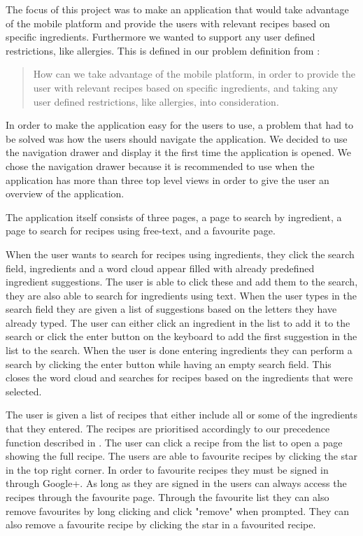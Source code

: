 The focus of this project was to make an application that would take advantage of the mobile platform and provide the users with relevant recipes based on specific ingredients. Furthermore we wanted to support any user defined restrictions, like allergies.
This is defined in our problem definition from :
\begin{quote}
How can we take advantage of the mobile platform, in order to provide the user with relevant recipes based on specific ingredients, and taking any user defined restrictions, like allergies, into consideration.
\end{quote}
In order to make the application easy for the users to use, a problem that had to be solved was how the users should navigate the application. We decided to use the navigation drawer and display it the first time the application is opened. We chose the navigation drawer because it is recommended to use when the application has more than three top level views in order to give the user an overview of the application.

The application itself consists of three pages, a page to search by ingredient, a page to search for recipes using free-text, and a favourite page. 

When the user wants to search for recipes using ingredients, they click the search field, ingredients and a word cloud appear filled with already predefined ingredient suggestions. The user is able to click these and add them to the search, they are also able to search for ingredients using text. When the user types in the search field they are given a list of suggestions based on the letters they have already typed. The user can either click an ingredient in the list to add it to the search or click the enter button on the keyboard to add the first suggestion in the list to the search. When the user is done entering ingredients they can perform a search by clicking the enter button while having an empty search field. This closes the word cloud and searches for recipes based on the ingredients that were selected. 

The user is given a list of recipes that either include all or some of the ingredients that they entered. The recipes are prioritised accordingly to our precedence function described in . The user can click a recipe from the list to open a page showing the full recipe. The users are able to favourite recipes by clicking the star in the top right corner. In order to favourite recipes they must be signed in through Google+. As long as they are signed in the users can always access the recipes through the favourite page. Through the favourite list they can also remove favourites by long clicking and click "remove" when prompted. They can also remove a favourite recipe by clicking the star in a favourited recipe.

